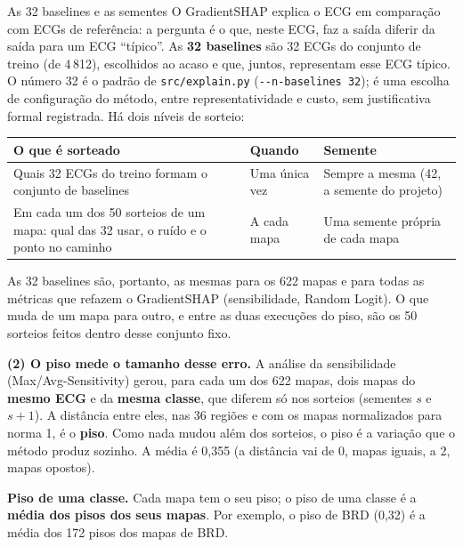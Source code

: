 \documentclass[11pt,a4paper]{article}
\begin{document}
\begin{infobox}[note]{As 32 baselines e as sementes}
O GradientSHAP explica o ECG em comparação com ECGs de referência: a pergunta é o que, neste ECG, faz a saída diferir da saída para um ECG “típico”. As \textbf{32 baselines} são 32 ECGs do conjunto de treino (de 4\,812), escolhidos ao acaso e que, juntos, representam esse ECG típico. O número 32 é o padrão de \texttt{src/explain.py} (\texttt{-{}-n-baselines 32}); é uma escolha de configuração do método, entre representatividade e custo, sem justificativa formal registrada. Há dois níveis de sorteio:
\begin{center}\small
\begin{tabularx}{\linewidth}{XXX}
\toprule
\textbf{O que é sorteado} & \textbf{Quando} & \textbf{Semente} \\
\midrule
Quais 32 ECGs do treino formam o conjunto de baselines & Uma única vez & Sempre a mesma (42, a semente do projeto) \\ \addlinespace
Em cada um dos 50 sorteios de um mapa: qual das 32 usar, o ruído e o ponto no caminho & A cada mapa & Uma semente própria de cada mapa \\
\bottomrule
\end{tabularx}
\end{center}
As 32 baselines são, portanto, as mesmas para os 622 mapas e para todas as métricas que refazem o GradientSHAP (sensibilidade, Random Logit). O que muda de um mapa para outro, e entre as duas execuções do piso, são os 50 sorteios feitos dentro desse conjunto fixo.
\end{infobox}

\textbf{(2) O piso mede o tamanho desse erro.} A análise da sensibilidade (Max/Avg-Sensitivity) gerou, para cada um dos 622 mapas, dois mapas do \textbf{mesmo ECG} e da \textbf{mesma classe}, que diferem só nos sorteios (sementes $s$ e $s+1$). A distância entre eles, nas 36 regiões e com os mapas normalizados para norma 1, é o \textbf{piso}. Como nada mudou além dos sorteios, o piso é a variação que o método produz sozinho. A média é 0,355 (a distância vai de 0, mapas iguais, a 2, mapas opostos).

\textbf{Piso de uma classe.} Cada mapa tem o seu piso; o piso de uma classe é a \textbf{média dos pisos dos seus mapas}. Por exemplo, o piso de BRD (0,32) é a média dos 172 pisos dos mapas de BRD.
\end{document}
